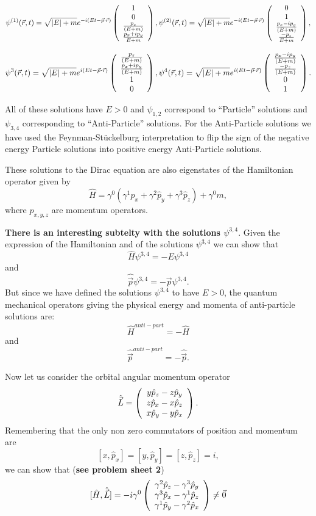 \begin{equation}
\label{eqn:dirac_gen_pos_soln}
\psi^{(1)}(\vec{r},t)=\sqrt{|E|+m}  e^{-i(Et-\vec{p}\cdot\vec{r})}
 \left( \begin{array}{c} 1 \\ 0 \\ \frac{p_z}{(E+m)} \\ \frac{p_x+ip_y}{E+m}\end{array} \right),
\psi^{(2)}(\vec{r},t)=\sqrt{|E|+m}
e^{-i(Et-\vec{p}\cdot\vec{r})} \left( \begin{array}{c} 0 \\ 1 \\ \frac{p_x-ip_y}{(E+m)} \\ \frac{-p_z}{E+m}\end{array} \right),
\end{equation}

\begin{equation}
\label{eqn:dirac_gen_neg_soln}
\psi^{3}(\vec{r},t)=\sqrt{|E|+m}  e^{i(Et-\vec{p}\cdot\vec{r})}
 \left( \begin{array}{c} \frac{p_z}{(E+m)} \\ \frac{p_x+ip_y}{(E+m)} \\ 1 \\ 0\end{array} \right),
\psi^{4}(\vec{r},t)=\sqrt{|E|+m}  e^{i(Et-\vec{p}\cdot\vec{r})}
 \left( \begin{array}{c} \frac{p_x-ip_y}{(E+m)} \\ \frac{-p_z}{(E+m)} \\ 0 \\ 1\end{array} \right).
\end{equation}


All of these solutions have $E>0$ and $\psi_{1,2}$ correspond to ``Particle'' solutions
and $\psi_{3,4}$ corresponding to ``Anti-Particle'' solutions. For the Anti-Particle solutions
we have used the Feynman-St\"uckelburg interpretation to flip the sign of the negative
energy Particle solutions into positive energy Anti-Particle solutions.


These solutions to the Dirac equation are also eigenstates of the Hamiltonian operator given by
\[
 \hat{H} = \gamma^{0}(\gamma^1\hat{p}_x+ \gamma^2\hat{p}_y + \gamma^3\hat{p}_z)+\gamma^{0}m, 
\]
where $\hat{p}_{x,y,z}$ are momentum operators.

{\bf There is an interesting subtelty with the solutions $\psi^{3,4}$}. Given the expression
of the Hamiltonian and of the solutions $\psi^{3,4}$ we can show that
\[
   \hat{H}\psi^{3,4} = -E\psi^{3,4}
\]
and
\[
   \hat{\vec{p}}\psi^{3,4} = -\vec{p}\psi^{3,4}.
\]
But since we have defined the solutions $\psi^{3,4}$ to have $E>0$, the quantum mechanical
operators giving the physical energy and momenta of anti-particle solutions are:
\[
   \hat{H}^{anti-part} = -\hat{H}
\]
and
\[
   \hat{\vec{p}}^{anti-part} = -\hat{\vec{p}}.
\]

Now let us consider the orbital angular momentum operator 
\[\hat{\vec{L}} =
 \left( \begin{array}{c} y\hat{p}_z-z\hat{p}_y \\ z\hat{p}_x-x\hat{p}_z \\ x\hat{p}_y-y\hat{p}_x\end{array} \right).\]
Remembering that the only non zero commutators of position and momentum are 
\[ [x,\hat{p}_x] = [y,\hat{p}_y] =  [z,\hat{p}_z] =
  i, 
\]
we can show that ({\bf see problem sheet 2})\[
[\hat{H},\hat{\vec{L}}] =
-i\gamma^{0} \left( \begin{array}{c} \gamma^2\hat{p}_z-\gamma^3\hat{p}_y \\ \gamma^3\hat{p}_x-\gamma^1\hat{p}_z \\ \gamma^1\hat{p}_y-\gamma^2\hat{p}_x\end{array} \right)\neq\vec{0}
\]

